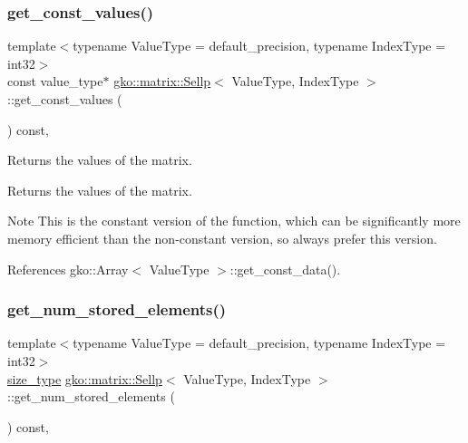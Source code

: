 \subsubsection{\texorpdfstring{get\+\_\+const\+\_\+values()}{get\_const\_values()}}
{\footnotesize\ttfamily template$<$typename Value\+Type = default\+\_\+precision, typename Index\+Type = int32$>$ \\
const value\+\_\+type$\ast$ \hyperlink{classgko_1_1matrix_1_1Sellp}{gko\+::matrix\+::\+Sellp}$<$ Value\+Type, Index\+Type $>$\+::get\+\_\+const\+\_\+values (\begin{DoxyParamCaption}{ }\end{DoxyParamCaption}) const\hspace{0.3cm}{\ttfamily [inline]}, {\ttfamily [noexcept]}}



Returns the values of the matrix. 

\begin{DoxyReturn}{Returns}
the values of the matrix.
\end{DoxyReturn}
\begin{DoxyNote}{Note}
This is the constant version of the function, which can be significantly more memory efficient than the non-\/constant version, so always prefer this version. 
\end{DoxyNote}


References gko\+::\+Array$<$ Value\+Type $>$\+::get\+\_\+const\+\_\+data().

\mbox{\label{classgko_1_1matrix_1_1Sellp_aab92660b6249e243e3ad35a51c557f3b}} 
\subsubsection{\texorpdfstring{get\+\_\+num\+\_\+stored\+\_\+elements()}{get\_num\_stored\_elements()}}
{\footnotesize\ttfamily template$<$typename Value\+Type = default\+\_\+precision, typename Index\+Type = int32$>$ \\
\hyperlink{namespacegko_a6e5c95df0ae4e47aab2f604a22d98ee7}{size\+\_\+type} \hyperlink{classgko_1_1matrix_1_1Sellp}{gko\+::matrix\+::\+Sellp}$<$ Value\+Type, Index\+Type $>$\+::get\+\_\+num\+\_\+stored\+\_\+elements (\begin{DoxyParamCaption}{ }\end{DoxyParamCaption}) const\hspace{0.3cm}{\ttfamily [inline]}, {\ttfamily [noexcept]}}



